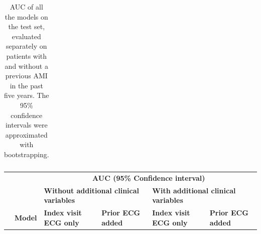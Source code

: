 \documentclass[preprint]{elsarticle}
\begin{document}
\begin{table}[H]
\begin{adjustbox}{center}
\begin{tabular}{@{}llcccc@{}}
\bottomrule
\end{tabular}
\end{adjustbox}
\caption{AUC of all the models on the test set, evaluated separately on patients with and without a previous AMI in the past five years. The 95\% confidence intervals were approximated with bootstrapping.} 
\label{table:appendix:ami}
\end{table}
\renewcommand{\arraystretch}{1}




\renewcommand{\arraystretch}{1.2}
\begin{table}[H]
  \centering
  \scriptsize
\begin{adjustbox}{center}
\begin{tabular}{@{}llcccc@{}}
  \toprule
  & & \multicolumn{4}{c}{\textbf{AUC (95\% Confidence interval)}} \\
  \cmidrule(lr){3-6}
  & & \multicolumn{2}{l}{\textbf{Without additional clinical variables}} & \multicolumn{2}{l}{\textbf{With additional clinical variables}} \\
  \cmidrule(lr){3-4}\cmidrule(lr){5-6}
  & \multicolumn{1}{l}{\textbf{Model}} & \multicolumn{1}{l}{\textbf{Index visit ECG only}} & \multicolumn{1}{l}{\textbf{Prior ECG added}} & \multicolumn{1}{l}{\textbf{Index visit ECG only}} & \multicolumn{1}{l}{\textbf{Prior ECG added}} \\
  \midrule


\end{tabular}
\end{adjustbox}
\end{table}
\end{document}
